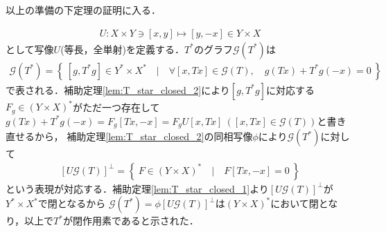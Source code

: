 	以上の準備の下定理の証明に入る．
	\begin{prf}
		\begin{align}
			U : X \times Y \ni [x,y] \longmapsto [y,-x] \in Y \times X
		\end{align}
		として写像$U$(等長，全単射)を定義する．$T^*$のグラフ$\mathscr{G}(T^*)$は
		\begin{align}
			\mathscr{G}(T^*) = \left\{\ [g,T^*g] \in Y^* \times X^*\quad |\quad \forall [x,Tx] \in \mathscr{G}(T),\quad g(Tx) + T^*g(-x) = 0\ \right\}
		\end{align}
		で表される．補助定理\ref{lem:T_star_closed_2}により$[g,T^*g]$に対応する$F_g \in (Y \times X)^*$がただ一つ存在して
		$g(Tx) + T^*g(-x) = F_g[Tx,-x] = F_gU[x,Tx]\ ([x,Tx] \in \mathscr{G}(T))$と書き直せるから，
		補助定理\ref{lem:T_star_closed_2}の同相写像$\phi$により$\mathscr{G}(T^*)$に対して
		\begin{align}
			\left[U\mathscr{G}(T) \right]^{\perp} = \left\{\ F \in (Y \times X)^*\quad |\quad F[Tx,-x] = 0\ \right\}
		\end{align}
		という表現が対応する．補助定理\ref{lem:T_star_closed_1}より$\left[U\mathscr{G}(T) \right]^{\perp}$が$Y^* \times X^*$で閉となるから
		$\mathscr{G}(T^*) = \phi \left[U\mathscr{G}(T) \right]^{\perp}$は$(Y \times X)^*$において閉となり，以上で$T^*$が閉作用素であると示された．
		\QED
	\end{prf}
	